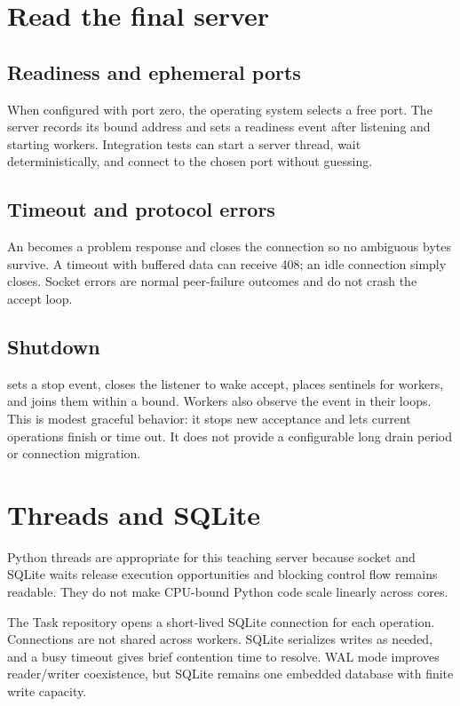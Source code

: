 \section{Read the final server}


\subsection{Readiness and ephemeral ports}

When configured with port zero, the operating system selects a free port. The
server records its bound address and sets a readiness event after listening and
starting workers. Integration tests can start a server thread, wait deterministically,
and connect to the chosen port without guessing.

\subsection{Timeout and protocol errors}

An  becomes a problem response and closes the connection so no
ambiguous bytes survive. A timeout with buffered data can receive 408; an idle
connection simply closes. Socket errors are normal peer-failure outcomes and do
not crash the accept loop.

\subsection{Shutdown}

 sets a stop event, closes the listener to wake accept, places
sentinels for workers, and joins them within a bound. Workers also observe the
event in their loops. This is modest graceful behavior: it stops new acceptance
and lets current operations finish or time out. It does not provide a configurable
long drain period or connection migration.

\section{Threads and SQLite}

Python threads are appropriate for this teaching server because socket and
SQLite waits release execution opportunities and blocking control flow remains
readable. They do not make CPU-bound Python code scale linearly across cores.

The Task repository opens a short-lived SQLite connection for each operation.
Connections are not shared across workers. SQLite serializes writes as needed,
and a busy timeout gives brief contention time to resolve. WAL mode improves
reader/writer coexistence, but SQLite remains one embedded database with finite
write capacity.

